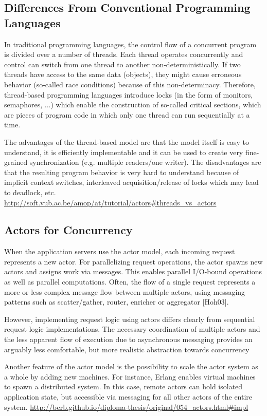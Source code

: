 \subsection{Differences From Conventional Programming Languages}
In traditional programming languages, the control flow of a concurrent program is divided over a number of threads. Each thread operates concurrently and control can switch from one thread to another non-deterministically. If two threads have access to the same data (objects), they might cause erroneous behavior (so-called race conditions) because of this non-determinacy. Therefore, thread-based programming languages introduce locks (in the form of monitors, semaphores, ...) which enable the construction of so-called critical sections, which are pieces of program code in which only one thread can run sequentially at a time.

The advantages of the thread-based model are that the model itself is easy to understand, it is efficiently implementable and it can be used to create very fine-grained synchronization (e.g. multiple readers/one writer). The disadvantages are that the resulting program behavior is very hard to understand because of implicit context switches, interleaved acquisition/release of locks which may lead to deadlock, etc. \url{http://soft.vub.ac.be/amop/at/tutorial/actors#threads_vs_actors}

\subsection{Actors for Concurrency}
When the application servers use the actor model, each incoming request represents a new actor. For parallelizing request operations, the actor spawns new actors and assigns work via messages. This enables parallel I/O-bound operations as well as parallel computations. Often, the flow of a single request represents a more or less complex message flow between multiple actors, using messaging patterns such as scatter/gather, router, enricher or aggregator [Hoh03].

However, implementing request logic using actors differs clearly from sequential request logic implementations. The necessary coordination of multiple actors and the less apparent flow of execution due to asynchronous messaging provides an arguably less comfortable, but more realistic abstraction towards concurrency

Another feature of the actor model is the possibility to scale the actor system as a whole by adding new machines. For instance, Erlang enables virtual machines to spawn a distributed system. In this case, remote actors can hold isolated application state, but accessible via messaging for all other actors of the entire system. \url{http://berb.github.io/diploma-thesis/original/054_actors.html#impl}

